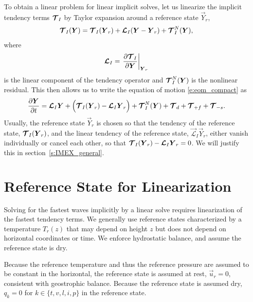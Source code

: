 \documentclass{report}
\begin{document}
To obtain a linear problem for linear implicit solves, let us linearize the implicit tendency terms $\boldsymbol{{\mathcal{T}}}_{I}$ by Taylor expansion around a reference state $\vec{Y}_r$,
\begin{equation}\label{e:imex_linearization}
\boldsymbol{{\mathcal{T}}}_{I}(\boldsymbol{{Y}}) =  \boldsymbol{{\mathcal{T}}}_I(\boldsymbol{{Y}}_r) + \boldsymbol{{\mathcal{L}}}_I (\boldsymbol{{Y}} - \boldsymbol{{Y}}_r) + \boldsymbol{{\mathcal{T}}}^N_{I}(\boldsymbol{{Y}}),
\end{equation}
where 
\begin{equation}
    \boldsymbol{{\mathcal{L}}}_I = \left. \frac{\partial\boldsymbol{{\mathcal{T}}}_I}{\partial\boldsymbol{{Y}}}\right|_{\boldsymbol{{Y}}_r}
\end{equation} 
is the linear component of the tendency operator and $\boldsymbol{{\mathcal{T}}}^N_{I}(\boldsymbol{{Y}})$ is the nonlinear residual. This then allows us to write the equation of motion \eqref{e:eom_compact} as
\begin{equation}
\label{eq:IMEX}
\frac{\partial\boldsymbol{{Y}}}{\partial t} =  \boldsymbol{{\mathcal{L}}}_I \boldsymbol{{Y}} + \Bigl(\boldsymbol{{\mathcal{T}}}_I(\boldsymbol{{Y}}_r) - \boldsymbol{{\mathcal{L}}}_I \boldsymbol{{Y}}_r\Bigr) + \boldsymbol{{\mathcal{T}}}^N_{I}(\boldsymbol{{Y}}) + \boldsymbol{{\mathcal{T}}}_{d} + \boldsymbol{{\mathcal{T}}}_{+f} + \boldsymbol{{\mathcal{T}}}_{-s}.
\end{equation}
Usually, the reference state $\vec{Y}_r$ is chosen so that the tendency of the reference state, $\boldsymbol{{\mathcal{T}}}_I(\boldsymbol{{Y}}_r)$, and the linear tendency of the reference state, $\vec{\mathcal{L}}_I \vec{Y}_r$, either vanish individually or cancel each other, so that $\boldsymbol{{\mathcal{T}}}_I(\boldsymbol{{Y}}_r) - \boldsymbol{{\mathcal{L}}}_I \boldsymbol{{Y}}_r=0$. We will justify this in section~\ref{s:IMEX_general}.

\section{Reference State for Linearization}

Solving for the fastest waves implicitly by a linear solve requires linearization of the fastest tendency terms. We generally use reference states characterized by a temperature $T_r(z)$ that may depend on height $z$ but does not depend on horizontal coordinates or time. We enforce hydrostatic balance, and assume the reference state is dry.

Because the reference temperature and thus the reference pressure are assumed to be constant in the horizontal, the reference state is assumed at rest, $\vec{u}_r = 0$, consistent with geostrophic balance. Because the reference state is assumed dry, $q_k= 0$ for $k \in \{ t, v, l, i, p\}$ in the reference state.
\end{document}
